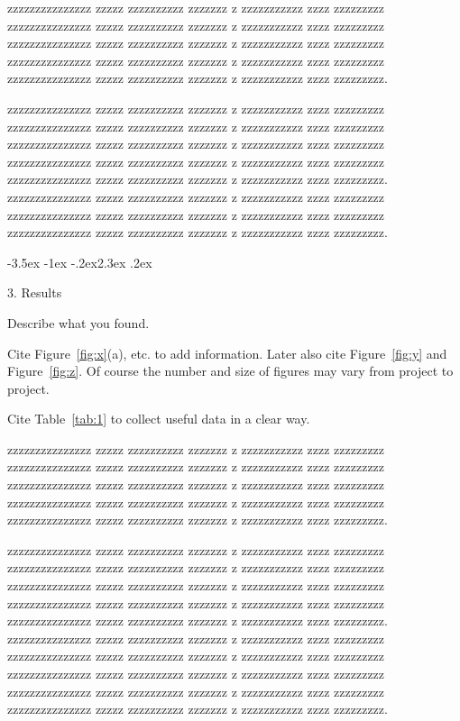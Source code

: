 \documentclass[prl,twocolumn]{revtex4-1}
\makeatletter
\renewcommand{\section}{\@startsection{section}{1}{\z@}%
	{-3.5ex \@plus -1ex \@minus -.2ex}{2.3ex \@plus.2ex}%
	{\normalfont\bfseries\raggedright}}
\makeatother
\begin{document}
  
  zzzzzzzzzzzzzzz zzzzz zzzzzzzzzz zzzzzzz z zzzzzzzzzzz zzzz zzzzzzzzz
  zzzzzzzzzzzzzzz zzzzz zzzzzzzzzz zzzzzzz z zzzzzzzzzzz zzzz zzzzzzzzz
  zzzzzzzzzzzzzzz zzzzz zzzzzzzzzz zzzzzzz z zzzzzzzzzzz zzzz zzzzzzzzz
  zzzzzzzzzzzzzzz zzzzz zzzzzzzzzz zzzzzzz z zzzzzzzzzzz zzzz zzzzzzzzz
  zzzzzzzzzzzzzzz zzzzz zzzzzzzzzz zzzzzzz z zzzzzzzzzzz zzzz zzzzzzzzz.


  zzzzzzzzzzzzzzz zzzzz zzzzzzzzzz zzzzzzz z zzzzzzzzzzz zzzz zzzzzzzzz
  zzzzzzzzzzzzzzz zzzzz zzzzzzzzzz zzzzzzz z zzzzzzzzzzz zzzz zzzzzzzzz
  zzzzzzzzzzzzzzz zzzzz zzzzzzzzzz zzzzzzz z zzzzzzzzzzz zzzz zzzzzzzzz
  zzzzzzzzzzzzzzz zzzzz zzzzzzzzzz zzzzzzz z zzzzzzzzzzz zzzz zzzzzzzzz
  zzzzzzzzzzzzzzz zzzzz zzzzzzzzzz zzzzzzz z zzzzzzzzzzz zzzz zzzzzzzzz.
  zzzzzzzzzzzzzzz zzzzz zzzzzzzzzz zzzzzzz z zzzzzzzzzzz zzzz zzzzzzzzz
  zzzzzzzzzzzzzzz zzzzz zzzzzzzzzz zzzzzzz z zzzzzzzzzzz zzzz zzzzzzzzz
  zzzzzzzzzzzzzzz zzzzz zzzzzzzzzz zzzzzzz z zzzzzzzzzzz zzzz zzzzzzzzz.
 


\section{3. Results}


Describe what you found.

Cite Figure~\ref{fig:x}(a), etc. to add information. Later also cite Figure~\ref{fig:y} and  Figure~\ref{fig:z}. Of course the number and size of figures may vary from project to project.

Cite Table~\ref{tab:1} to collect useful data in a clear way.

  zzzzzzzzzzzzzzz zzzzz zzzzzzzzzz zzzzzzz z zzzzzzzzzzz zzzz zzzzzzzzz
  zzzzzzzzzzzzzzz zzzzz zzzzzzzzzz zzzzzzz z zzzzzzzzzzz zzzz zzzzzzzzz
  zzzzzzzzzzzzzzz zzzzz zzzzzzzzzz zzzzzzz z zzzzzzzzzzz zzzz zzzzzzzzz
  zzzzzzzzzzzzzzz zzzzz zzzzzzzzzz zzzzzzz z zzzzzzzzzzz zzzz zzzzzzzzz
  zzzzzzzzzzzzzzz zzzzz zzzzzzzzzz zzzzzzz z zzzzzzzzzzz zzzz zzzzzzzzz.

  zzzzzzzzzzzzzzz zzzzz zzzzzzzzzz zzzzzzz z zzzzzzzzzzz zzzz zzzzzzzzz
  zzzzzzzzzzzzzzz zzzzz zzzzzzzzzz zzzzzzz z zzzzzzzzzzz zzzz zzzzzzzzz
  zzzzzzzzzzzzzzz zzzzz zzzzzzzzzz zzzzzzz z zzzzzzzzzzz zzzz zzzzzzzzz
  zzzzzzzzzzzzzzz zzzzz zzzzzzzzzz zzzzzzz z zzzzzzzzzzz zzzz zzzzzzzzz
  zzzzzzzzzzzzzzz zzzzz zzzzzzzzzz zzzzzzz z zzzzzzzzzzz zzzz zzzzzzzzz.
  zzzzzzzzzzzzzzz zzzzz zzzzzzzzzz zzzzzzz z zzzzzzzzzzz zzzz zzzzzzzzz
  zzzzzzzzzzzzzzz zzzzz zzzzzzzzzz zzzzzzz z zzzzzzzzzzz zzzz zzzzzzzzz
  zzzzzzzzzzzzzzz zzzzz zzzzzzzzzz zzzzzzz z zzzzzzzzzzz zzzz zzzzzzzzz
  zzzzzzzzzzzzzzz zzzzz zzzzzzzzzz zzzzzzz z zzzzzzzzzzz zzzz zzzzzzzzz
  zzzzzzzzzzzzzzz zzzzz zzzzzzzzzz zzzzzzz z zzzzzzzzzzz zzzz zzzzzzzzz.
  
\end{document}
